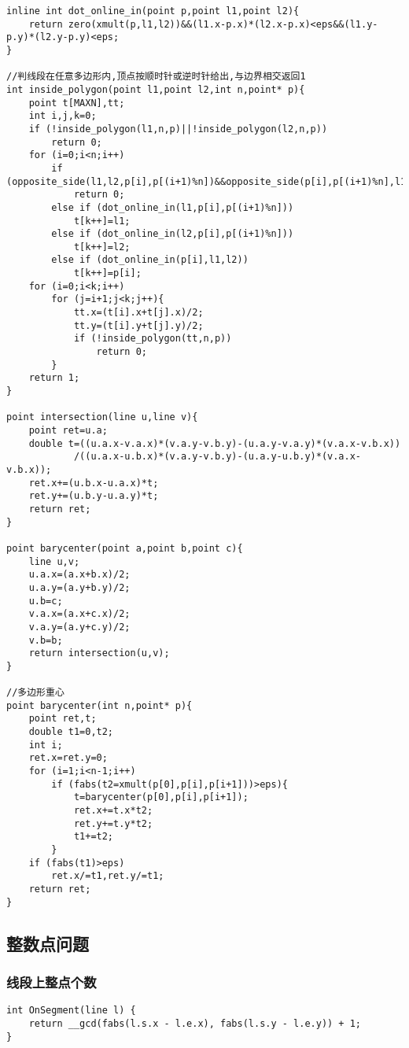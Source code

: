 \documentclass[a4]{article}
\begin{document}
\begin{lstlisting}
inline int dot_online_in(point p,point l1,point l2){
    return zero(xmult(p,l1,l2))&&(l1.x-p.x)*(l2.x-p.x)<eps&&(l1.y-p.y)*(l2.y-p.y)<eps;
}
 
//判线段在任意多边形内,顶点按顺时针或逆时针给出,与边界相交返回1
int inside_polygon(point l1,point l2,int n,point* p){
    point t[MAXN],tt;
    int i,j,k=0;
    if (!inside_polygon(l1,n,p)||!inside_polygon(l2,n,p))
        return 0;
    for (i=0;i<n;i++)
        if (opposite_side(l1,l2,p[i],p[(i+1)%n])&&opposite_side(p[i],p[(i+1)%n],l1,l2))
            return 0;
        else if (dot_online_in(l1,p[i],p[(i+1)%n]))
            t[k++]=l1;
        else if (dot_online_in(l2,p[i],p[(i+1)%n]))
            t[k++]=l2;
        else if (dot_online_in(p[i],l1,l2))
            t[k++]=p[i];
    for (i=0;i<k;i++)
        for (j=i+1;j<k;j++){
            tt.x=(t[i].x+t[j].x)/2;
            tt.y=(t[i].y+t[j].y)/2;
            if (!inside_polygon(tt,n,p))
                return 0;          
        }
    return 1;
}
 
point intersection(line u,line v){
    point ret=u.a;
    double t=((u.a.x-v.a.x)*(v.a.y-v.b.y)-(u.a.y-v.a.y)*(v.a.x-v.b.x))
            /((u.a.x-u.b.x)*(v.a.y-v.b.y)-(u.a.y-u.b.y)*(v.a.x-v.b.x));
    ret.x+=(u.b.x-u.a.x)*t;
    ret.y+=(u.b.y-u.a.y)*t;
    return ret;
}
 
point barycenter(point a,point b,point c){
    line u,v;
    u.a.x=(a.x+b.x)/2;
    u.a.y=(a.y+b.y)/2;
    u.b=c;
    v.a.x=(a.x+c.x)/2;
    v.a.y=(a.y+c.y)/2;
    v.b=b;
    return intersection(u,v);
}
 
//多边形重心
point barycenter(int n,point* p){
    point ret,t;
    double t1=0,t2;
    int i;
    ret.x=ret.y=0;
    for (i=1;i<n-1;i++)
        if (fabs(t2=xmult(p[0],p[i],p[i+1]))>eps){
            t=barycenter(p[0],p[i],p[i+1]);
            ret.x+=t.x*t2;
            ret.y+=t.y*t2;
            t1+=t2;
        }
    if (fabs(t1)>eps)
        ret.x/=t1,ret.y/=t1;
    return ret;
}
\end{lstlisting}
\subsection{整数点问题}
\subsubsection{线段上整点个数}
\begin{lstlisting}
int OnSegment(line l) {
	return __gcd(fabs(l.s.x - l.e.x), fabs(l.s.y - l.e.y)) + 1;
}
\end{lstlisting}
\end{document}

